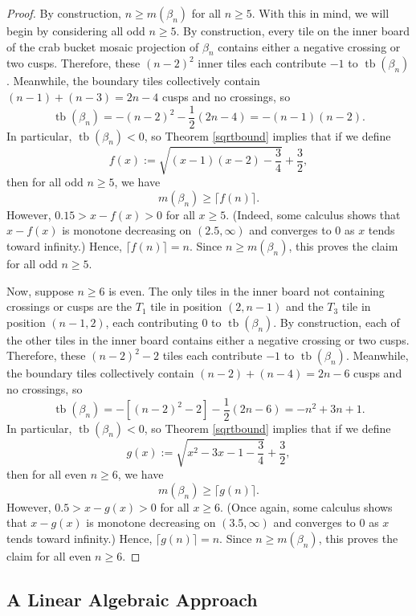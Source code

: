 \documentclass{article}
\DeclareMathOperator{\tb}{tb}
\begin{document}
\begin{proof}
    By construction, $n\geq m(\beta_n)$ for all $n\geq 5$.
    With this in mind, we will begin by considering all odd $n\geq 5$.
    By construction, every tile on the inner board of the crab bucket mosaic projection of $\beta_n$ contains either a negative crossing or two cusps.
    Therefore, these $(n-2)^2$ inner tiles each contribute $-1$ to $\operatorname{tb}(\beta_n)$. Meanwhile, the boundary tiles collectively contain $(n-1)+(n-3)=2n-4$ cusps and no crossings, so
    \[
    \operatorname{tb}(\beta_n) = -(n-2)^2 -\frac{1}{2}(2n-4) = -(n-1)(n-2).
    \]
    In particular, $\tb(\beta_n)<0$, so Theorem \ref{sqrtbound} implies that if we define
    \[f(x):=\sqrt{(x-1)(x-2)-\frac{3}{4}} + \frac{3}{2},\]
    then for all odd $n\geq 5$, we have
    \[
    m(\beta_n)\geq \lceil f(n)\rceil.
    \]
    However, $0.15>x-f(x)> 0$ for all $x\geq 5$. (Indeed, some calculus shows that $x-f(x)$ is monotone decreasing on $(2.5,\infty)$ and converges to 0 as $x$ tends toward infinity.) Hence, $\lceil f(n)\rceil = n$. Since $n \geq m(\beta_n)$,
    this proves the claim for all odd $n\geq 5$.

    Now, suppose $n\geq 6$ is even.
    The only tiles in the inner board not containing crossings or cusps are the $T_1$ tile in position $(2, n-1)$ and the $T_3$ tile in position $(n-1,2)$, each contributing 0 to $\tb(\beta_n)$.
    By construction, each of the other tiles in the inner board contains either a negative crossing or two cusps.
    Therefore, these $(n-2)^2-2$ tiles each contribute $-1$ to $\operatorname{tb}(\beta_n)$. Meanwhile, the boundary tiles collectively contain $(n-2)+(n-4)=2n-6$ cusps and no crossings, so
    \[
    \operatorname{tb}(\beta_n) = -\left[(n-2)^2 -2\right] -\frac{1}{2}(2n-6) = -n^2+3n+1.
    \]
    In particular, $\tb(\beta_n)<0$, so Theorem \ref{sqrtbound} implies that if we define
    \[g(x):=\sqrt{x^2-3x-1-\frac{3}{4}} + \frac{3}{2},\]
    then for all even $n\geq 6$, we have
    \[
    m(\beta_n)\geq \lceil g(n)\rceil.
    \]
    However, $0.5>x-g(x)> 0$ for all $x\geq 6$. (Once again, some calculus shows that $x-g(x)$ is monotone decreasing on $(3.5,\infty)$ and converges to 0 as $x$ tends toward infinity.) Hence,
    $\lceil g(n)\rceil = n $. Since $n\geq m(\beta_n)$, this proves the claim for all even $n\geq 6$.
\end{proof}

\subsection{A Linear Algebraic Approach} \label{linear}
\end{document}
